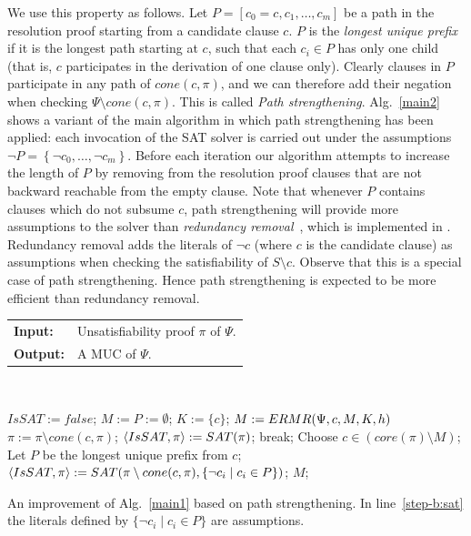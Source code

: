 \documentclass[twoside,11pt]{article}
\newcommand\muser{\tool{MUSer2}\xspace}
\renewcommand\Pr{\pi}
\begin{document}
We use this property as follows. Let $P=\left[c_0=c,c_1,\ldots,c_m\right]$ be
a path in the resolution proof starting from a candidate clause $c$.  $P$ is
the \emph{longest unique prefix} if it is the longest path starting at $c$,
such that each $c_i \in P$ has only one child (that is, $c$ participates in
the derivation of one clause only). Clearly clauses in $P$ participate in any
path of $cone(c,\Pr)$, and we can therefore add their negation when checking
$\Psi\setminus cone(c,\Pr)$. This is called \emph{Path strengthening}.
Alg.~\ref{main2} shows a variant of the main algorithm in which path
strengthening has been applied: each invocation of the SAT solver is carried
out under the assumptions $\lnot P=\left\{\lnot c_0,\ldots,\lnot
c_m\right\}$. Before each iteration our algorithm attempts to increase the length of $P$
by removing from the resolution proof clauses that are not backward
reachable from the empty clause. Note that whenever $P$ contains clauses
which do not subsume $c$, path strengthening will provide more assumptions to
the solver than \emph{redundancy
removal}~\cite{DBLP:conf/sat/MaarenW08,DBLP:journals/aicom/BelovLM12}, which
is implemented in \muser. Redundancy removal adds the
literals of $\lnot c$ (where $c$ is the candidate clause) as assumptions when
checking the satisfiability of $S \setminus c$. Observe that this is a
special case of path strengthening. Hence path strengthening is expected to
be more efficient than redundancy removal.





\begin{algorithm}
\begin{tabular}{lp{8.5 cm}}
{\bf Input:}  & Unsatisfiability proof $\Pr$ of $\Psi$.\\
{\bf Output:} & A MUC of $\Psi$. \\
\end{tabular} \\
\vspace {0.3 cm}
\begin{algorithmic}[1]
\State $IsSAT := false$;
\State $M := P := \emptyset$;
\State \label{step-K5}$K := \{c\}$;
\State \label{step-call5}$M := {\sc ERMR} (\Psi, c, M, K, h)$ 
\Else
{}  
\State $\Pr := \Pr \setminus  cone(c,\Pr)$;
  
\State \label{step-b:sat1} $\langle IsSAT,\Pr\rangle := \alg{SAT}(\Pr)$; 
\EndIf
\EndIf
\EndIf
\If {$core(\Pr) = M$} break; \EndIf
\State Choose $c \in (core(\Pr) \setminus M)$;
\State Let $P$ be the longest unique prefix from $c$;
\State \label{step-b:sat}$\langle IsSAT,\Pr\rangle :=  \alg{SAT}(\Pr \setminus cone(c,\Pr), \{\lnot c_i \mid c_i \in P\})$; 
\EndWhile
\State \Return $M$;

\end{algorithmic}
\caption{An improvement of Alg.~\ref{main1} based on path strengthening. In
line~\ref{step-b:sat} the literals defined by $\{\lnot c_i \mid c_i \in P\}$
are assumptions.} \label{main2}
\end{algorithm}
\end{document}
